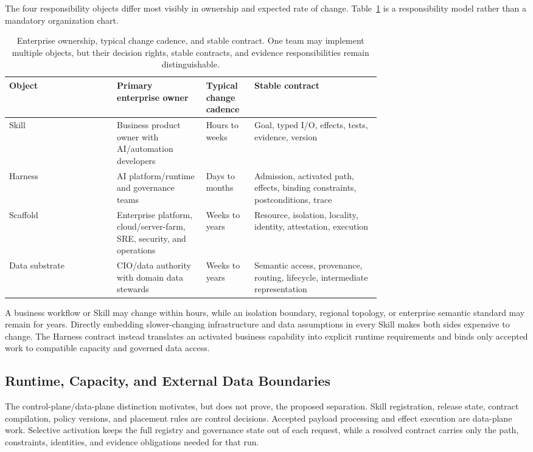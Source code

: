 \documentclass[11pt]{article}
\begin{document}
The four responsibility objects differ most visibly in ownership and expected rate of change. Table~\ref{tab:ownership-cadence} is a responsibility model rather than a mandatory organization chart.

\begin{table}[H]
\centering
\caption{Enterprise ownership, typical change cadence, and stable contract. One team may implement multiple objects, but their decision rights, stable contracts, and evidence responsibilities remain distinguishable.}
\label{tab:ownership-cadence}
\small
\begin{tabular}{lp{0.24\linewidth}p{0.13\linewidth}p{0.34\linewidth}}
\hline
Object & Primary enterprise owner & Typical change cadence & Stable contract \\
\hline
Skill & Business product owner with AI/automation developers & Hours to weeks & Goal, typed I/O, effects, tests, evidence, version \\
Harness & AI platform/runtime and governance teams & Days to months & Admission, activated path, effects, binding constraints, postconditions, trace \\
Scaffold & Enterprise platform, cloud/server-farm, SRE, security, and operations & Weeks to years & Resource, isolation, locality, identity, attestation, execution \\
Data substrate & CIO/data authority with domain data stewards & Weeks to years & Semantic access, provenance, routing, lifecycle, intermediate representation \\
\hline
\end{tabular}
\end{table}

A business workflow or Skill may change within hours, while an isolation boundary, regional topology, or enterprise semantic standard may remain for years. Directly embedding slower-changing infrastructure and data assumptions in every Skill makes both sides expensive to change. The Harness contract instead translates an activated business capability into explicit runtime requirements and binds only accepted work to compatible capacity and governed data access.

\subsection{Runtime, Capacity, and External Data Boundaries}

The control-plane/data-plane distinction motivates, but does not prove, the proposed separation. Skill registration, release state, contract compilation, policy versions, and placement rules are control decisions. Accepted payload processing and effect execution are data-plane work. Selective activation keeps the full registry and governance state out of each request, while a resolved contract carries only the path, constraints, identities, and evidence obligations needed for that run.
\end{document}
